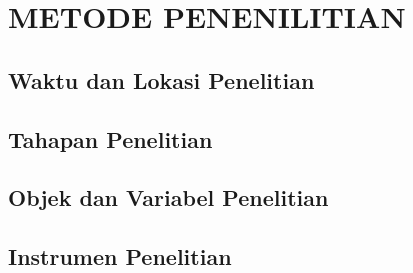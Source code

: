 
\chapter{METODE PENENILITIAN}

\section{Waktu dan Lokasi Penelitian}

\section{Tahapan Penelitian}

\section{Objek dan Variabel Penelitian}

\section{Instrumen Penelitian}
